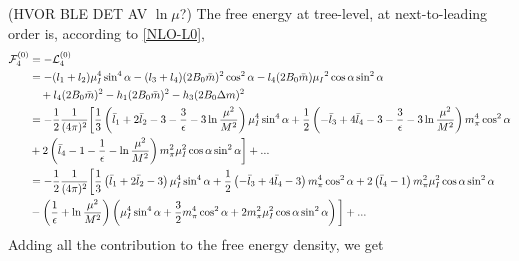 (HVOR BLE DET AV $\ln \mu$?)
The free energy at tree-level, at next-to-leading order is, according to \cref{NLO-L0}, 
\begin{align*}
    \mathcal{F}^{(0)}_4
    & 
    = - \mathcal{L}_4^{(0)} 
    \\
    & = 
    - (l_1 + l_2)\mu_I^4 \sin^4{\alpha}
    - (l_3 + l_4)(2 B_0 \bar m)^2 \cos^2{\alpha}
    - l_4 (2 B_0 \bar m ) \mu_I{}^2 \cos{\alpha} \sin^2{\alpha}
    \\
    & 
    \quad + l_4 (2B_0 \bar m )^2
    - h_1 (2B_0 \bar m)^2
    - h_3 (2B_0 \Delta m)^2
    \\
    & = 
    - \frac{1}{2} \frac{1}{(4 \pi)^2}
    \bigg[
        \frac{1}{3}
        \left( 
            \bar l_1 + 2 \bar l_2 - 3 - \frac{3}{\epsilon} - 3\ln \frac{\mu^2}{M^2}
        \right) \mu_I^4 \sin^4 \alpha
        +
        \frac{1}{2}
        \left(
            - \bar l_3 + 4 \bar l_4 - 3 - \frac{3}{\epsilon} - 3\ln \frac{\mu^2}{M^2}
        \right) m_\pi^4 \cos^2\alpha 
        \\
        &
        + 2 \left(\bar l_4 - 1 - \frac{1}{\epsilon} - \ln \frac{\mu^2}{M^2} \right)
        m_\pi^2 \mu_I^2 \cos\alpha \sin^2 \alpha
    \bigg] + ... 
    \\
    & = 
    - \frac{1}{2} \frac{1}{(4 \pi)^2}
    \bigg[
        \frac{1}{3}
        \left( 
            \bar l_1 + 2 \bar l_2 - 3
        \right) \mu_I^4 \sin^4 \alpha
        +
        \frac{1}{2}
        \left(
            - \bar l_3 + 4 \bar l_4 - 3
        \right) m_\pi^4 \cos^2\alpha 
        + 2 \left(\bar l_4 - 1\right)
        m_\pi^2 \mu_I^2 \cos\alpha \sin^2 \alpha
        \\
        &
        - 
        \left(\frac{1}{\epsilon} + \ln \frac{\mu^2}{M^2}\right) 
        \left(
            \mu_I^4\sin^4\alpha + \frac{3}{2} m_\pi^4 \cos^2 \alpha
            + 2 m_\pi^2 \mu_I^2 \cos\alpha \sin^2 \alpha
        \right)
    \bigg] + ... 
\end{align*}
Adding all the contribution to the free energy density, we get
